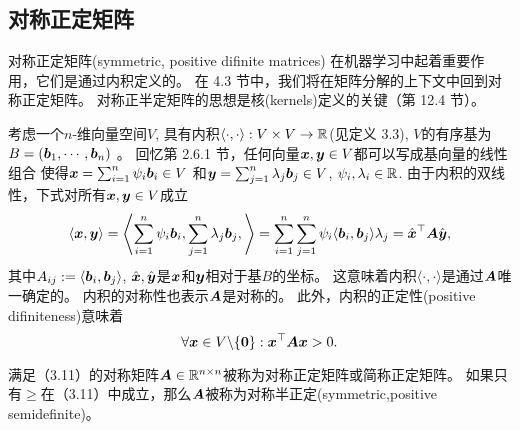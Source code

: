 \subsection{对称正定矩阵}
对称正定矩阵(symmetric, positive difinite matrices)
在机器学习中起着重要作用，它们是通过内积定义的。
在 4.3 节中，我们将在矩阵分解的上下文中回到对称正定矩阵。
对称正半定矩阵的思想是核(kernels)定义的关键（第 12.4 节）。

考虑一个$n$-维向量空间$V$,
具有内积$\langle\cdot,\cdot\rangle:V \times V \rightarrow \mathbb{R}$(见定义 3.3),
$V$的有序基为$B = (\boldsymbol{b}_1,\cdots, \boldsymbol{b}_n)$ 。
回忆第 2.6.1 节，任何向量$\boldsymbol{x}, \boldsymbol{y} \in V$都可以写成基向量的线性组合
使得$\boldsymbol{x} = \sum^n_{i=1}\psi_i\boldsymbol{b}_i \in V$
和$\boldsymbol{y} = \sum^n_{j=1}\lambda_j\boldsymbol{b}_j \in V$, $\psi_i,\lambda_i \in \mathbb{R}$.
由于内积的双线性，下式对所有$\boldsymbol{x},\boldsymbol{y} \in V$成立
\begin{equation}
    \left\langle\boldsymbol{x},\boldsymbol{y}\right\rangle =
    \left\langle
    \sum^n_{i=1}\psi_i\boldsymbol{b}_i,
    \sum^n_{j=1}\lambda_j\boldsymbol{b}_j,
    \right\rangle =
    \sum^n_{i=1}\sum^n_{j=1}\psi_i\langle\boldsymbol{b}_i,\boldsymbol{b}_j\rangle\lambda_j =
    \hat{\boldsymbol{x}}^\top \boldsymbol{A} \hat{\boldsymbol{y}},
\end{equation}
其中$A_{ij} := \langle\boldsymbol{b}_i,\boldsymbol{b}_j\rangle$,
$\hat{\boldsymbol{x}},\hat{\boldsymbol{y}}$是$\boldsymbol{x}$和$\boldsymbol{y}$相对于基$B$的坐标。
这意味着内积$\langle\cdot,\cdot\rangle$是通过$\boldsymbol{A}$唯一确定的。
内积的对称性也表示$\boldsymbol{A}$是对称的。
此外，内积的正定性(positive difiniteness)意味着
\begin{equation}
    \forall \boldsymbol{x} \in V\backslash\{\boldsymbol{0}\}:
    \boldsymbol{x}^\top \boldsymbol{A}\boldsymbol{x} > 0.
\end{equation}
\begin{definition}[对称正定矩阵]
    满足（3.11）的对称矩阵$\boldsymbol{A} \in \mathbb{R}^{n\times n}$被称为对称正定矩阵或简称正定矩阵。
    如果只有$\geqslant$在（3.11）中成立，那么$\boldsymbol{A}$被称为对称半正定(symmetric,positive semidefinite)。
\end{definition}

